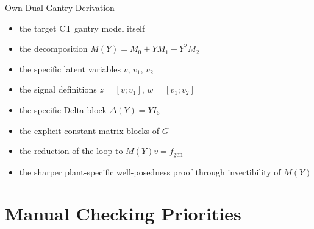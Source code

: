 ﻿\documentclass[11pt]{article}
\begin{document}
\begin{resultbox}{Own Dual-Gantry Derivation}
\begin{itemize}[leftmargin=1.2em]
    \item the target CT gantry model itself
    \item the decomposition $M(Y) = M_0 + YM_1 + Y^2M_2$
    \item the specific latent variables $v$, $v_1$, $v_2$
    \item the signal definitions $z = [v;v_1]$, $w = [v_1;v_2]$
    \item the specific Delta block $\Delta(Y) = YI_6$
    \item the explicit constant matrix blocks of $G$
    \item the reduction of the loop to $M(Y)v = f_{\mathrm{gen}}$
    \item the sharper plant-specific well-posedness proof through invertibility
    of $M(Y)$
\end{itemize}
\end{resultbox}

\section{Manual Checking Priorities}
\end{document}
